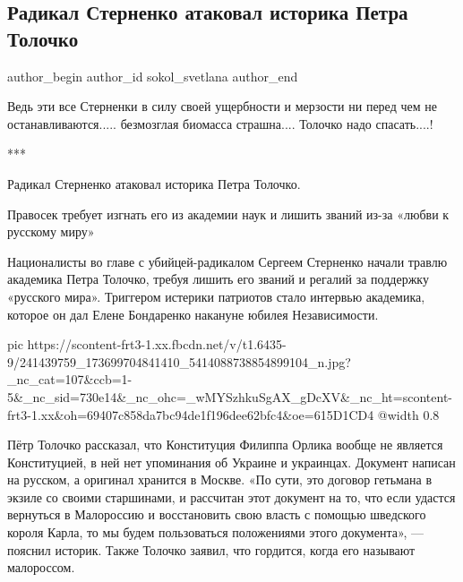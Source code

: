  
 
 
 
 
 
\subsection{Радикал Стерненко атаковал историка Петра Толочко}
\label{sec:06_09_2021.fb.sokol_svetlana.1.sternenko_tolochko}
 
\ifcmt
 author_begin
   author_id sokol_svetlana
 author_end
\fi

Ведь эти все Стерненки в силу своей ущербности  и  мерзости ни перед чем не
останавливаются..... безмозглая биомасса страшна.... Толочко надо спасать....!

***

Радикал Стерненко атаковал историка Петра Толочко. 

Правосек требует изгнать его из академии наук и лишить званий из-за «любви к
русскому миру»

Националисты во главе с убийцей-радикалом Сергеем Стерненко начали травлю
академика Петра Толочко, требуя лишить его званий и регалий за поддержку
«русского мира». Триггером истерики патриотов стало интервью академика, которое
он дал Елене Бондаренко накануне юбилея Независимости.

\ifcmt
  pic https://scontent-frt3-1.xx.fbcdn.net/v/t1.6435-9/241439759_173699704841410_5414088738854899104_n.jpg?_nc_cat=107&ccb=1-5&_nc_sid=730e14&_nc_ohc=_wMYSzhkuSgAX_gDcXV&_nc_ht=scontent-frt3-1.xx&oh=69407c858da7bc94de1f196dee62bfc4&oe=615D1CD4
  @width 0.8
\fi

Пётр Толочко рассказал, что Конституция Филиппа Орлика вообще не является
Конституцией, в ней нет упоминания об Украине и украинцах. Документ написан на
русском, а оригинал хранится в Москве. «По сути, это договор гетьмана в экзиле
со своими старшинами, и рассчитан этот документ на то, что если удастся
вернуться в Малороссию и восстановить свою власть с помощью шведского короля
Карла, то мы будем пользоваться положениями этого документа», — пояснил
историк. Также Толочко заявил, что гордится, когда его называют малороссом.

